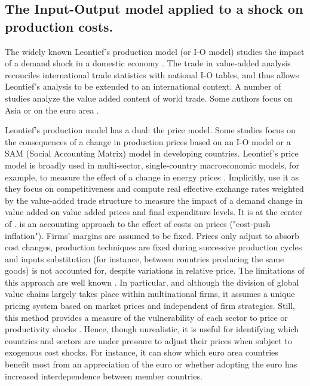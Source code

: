 \documentclass[11pt,a4paper]{article}
\begin{document}
\subsection{The Input-Output model applied to a shock on production costs.}
\label{subsec:io}
The widely known Leontief's production model (or I-O model) studies the impact of a demand shock in a domestic economy \citep{Leontief1951}. The trade in value-added analysis reconciles international trade statistics with national I-O tables, and thus allows Leontief's analysis to be extended to an international context. A number of studies \citep{Hummels2001,Daudin2006,Daudin2011, DeBacker2012,Johnson2012,Koopman2014, Amador2015,Los2016} analyze the value added content of world trade. Some authors focus on Asia \citep{Sato2014} or on the euro area \citep{Cappariello2015}.

Leontief's production model has a dual: the price model. Some studies focus on the consequences of a change in production prices based on an I-O model or a SAM (Social Accounting Matrix) model in developing countries. Leontief's price model is broadly used in multi-sector, single-country macroeconomic models, for example, to measure the effect of a change in energy prices \citep{Bournay2015, Sharify2013}. Implicitly, \cite{Bems2015} use it as they focus on competitiveness and compute real effective exchange rates weighted by the value-added trade structure to measure the impact of a demand change in value added on value added prices and final expenditure levels. It is at the center of \cite{Cochard2016}. 
\cite{Cochard2016} is an accounting approach to the effect of costs on prices ("cost-push inflation"). Firms' margins are assumed to be fixed. Prices only adjust to absorb cost changes, production techniques are fixed during successive production cycles and inputs substitution (for instance, between countries producing the same goods) is not accounted for, despite variations in relative price. The limitations of this approach are well known \citep{Folloni1994}. In particular, and although the division of global value chains largely takes place within multinational firms, it assumes a unique pricing system based on market prices and independent of firm strategies. Still, this method provides a measure of the vulnerability of each sector to price or productivity shocks \citep{Acemoglu2012,Carvalho2014}. Hence, though unrealistic, it is useful for identifying which countries and sectors are under pressure to adjust their prices when subject to exogenous cost shocks. For instance, it can show which euro area countries benefit most from an appreciation of the euro or whether adopting the euro has increased interdependence between member countries.
\end{document}
